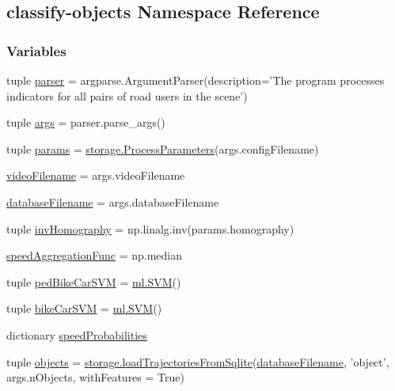 \hypertarget{namespaceclassify-objects}{\subsection{classify-\/objects Namespace Reference}
\label{namespaceclassify-objects}
}
\subsubsection*{Variables}
\begin{DoxyCompactItemize}
\item 
tuple \hyperlink{namespaceclassify-objects_a7b796869625c671d0bd8b25189e0947b}{parser} = argparse.\-Argument\-Parser(description='The program processes indicators for all pairs of road users in the scene')
\item 
tuple \hyperlink{namespaceclassify-objects_a6b18ad704ee94b3b4e23596aaad7bcf5}{args} = parser.\-parse\-\_\-args()
\item 
tuple \hyperlink{namespaceclassify-objects_a113b526a5c5fb0c4d8c825cf04475d5e}{params} = \hyperlink{classstorage_1_1ProcessParameters}{storage.\-Process\-Parameters}(args.\-config\-Filename)
\item 
\hyperlink{namespaceclassify-objects_a3a1d15c4d0d6976121267ea18d8dcc7d}{video\-Filename} = args.\-video\-Filename
\item 
\hyperlink{namespaceclassify-objects_a702e9e996d554a111f3df585e0027a45}{database\-Filename} = args.\-database\-Filename
\item 
tuple \hyperlink{namespaceclassify-objects_a1027931e1c6b656a7de2661847cfa267}{inv\-Homography} = np.\-linalg.\-inv(params.\-homography)
\item 
\hyperlink{namespaceclassify-objects_aa9f837b583e87056a3b9f3fe05bf056c}{speed\-Aggregation\-Func} = np.\-median
\item 
tuple \hyperlink{namespaceclassify-objects_ad8aa4cfa0495e4475a7a2783ab0cf6a2}{ped\-Bike\-Car\-S\-V\-M} = \hyperlink{classml_1_1SVM}{ml.\-S\-V\-M}()
\item 
tuple \hyperlink{namespaceclassify-objects_aebb63024c1d7480f628429cc52386d92}{bike\-Car\-S\-V\-M} = \hyperlink{classml_1_1SVM}{ml.\-S\-V\-M}()
\item 
dictionary \hyperlink{namespaceclassify-objects_a9d78ed6e8e795d4e3df3f3d99f8fbcfd}{speed\-Probabilities}
\item 
tuple \hyperlink{namespaceclassify-objects_a826dcbf61bf85134c0020343aa29b2b4}{objects} = \hyperlink{namespacestorage_aaafba9f6bc0816ff0084df5e1d892a9d}{storage.\-load\-Trajectories\-From\-Sqlite}(\hyperlink{namespaceclassify-objects_a702e9e996d554a111f3df585e0027a45}{database\-Filename}, 'object', args.\-n\-Objects, with\-Features = True)

\end{DoxyCompactItemize}
